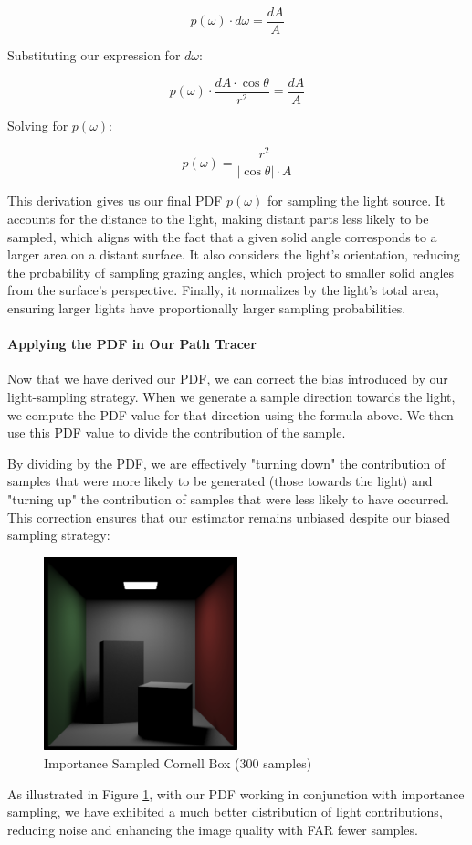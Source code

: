 \documentclass[12pt]{article}
\begin{document}
$$p(\omega) \cdot d\omega = \frac{dA}{A}$$

Substituting our expression for $d\omega$:

$$p(\omega) \cdot \frac{dA \cdot \cos\theta}{r^2} = \frac{dA}{A}$$

Solving for $p(\omega)$:

$$p(\omega) = \frac{r^2}{|\cos\theta| \cdot A}$$


This derivation gives us our final PDF $p(\omega)$ for sampling the light source.
It accounts for the distance to the light, making distant parts less likely to be sampled, which aligns with the fact that a given solid angle corresponds to a larger area on a distant surface. It also considers the light's orientation, reducing the probability of sampling grazing angles, which project to smaller solid angles from the surface's perspective. Finally, it normalizes by the light's total area, ensuring larger lights have proportionally larger sampling probabilities.

\paragraph{Applying the PDF in Our Path Tracer}

Now that we have derived our PDF, we can correct the bias introduced by our light-sampling strategy. When we generate a sample direction towards the light, we compute the PDF value for that direction using the formula above. We then use this PDF value to divide the contribution of the sample.

By dividing by the PDF, we are effectively "turning down" the contribution of samples that were more likely to be generated (those towards the light) and "turning up" the contribution of samples that were less likely to have occurred. This correction ensures that our estimator remains unbiased despite our biased sampling strategy:

\begin{figure}[H]
    \centering
    \includegraphics[width=0.5\textwidth]{images/importance_sampled.png}
    \caption{Importance Sampled Cornell Box (300 samples)}
    \label{fig:importancesampled}
\end{figure}
As illustrated in Figure \ref{fig:importancesampled}, with our PDF working in conjunction with importance sampling, we have exhibited a much better distribution of light contributions, reducing noise and enhancing the image quality with FAR fewer samples.
\end{document}
